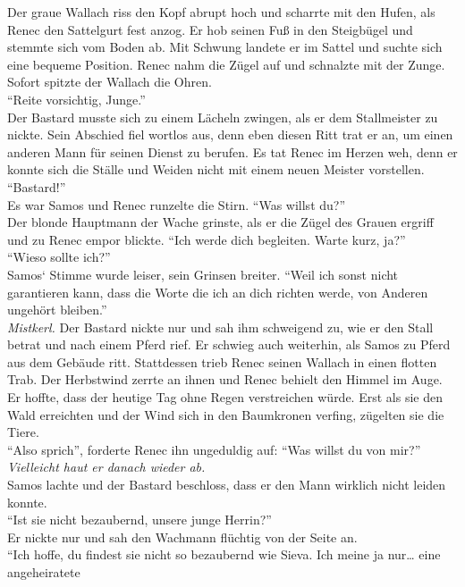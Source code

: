 Der graue Wallach riss den Kopf abrupt hoch und scharrte mit den Hufen, als Renec den Sattelgurt 
fest anzog. Er hob seinen Fuß in den Steigbügel und stemmte sich vom Boden ab. Mit Schwung landete 
er im Sattel und suchte sich eine bequeme Position. Renec nahm die Zügel auf und schnalzte mit der 
Zunge. Sofort spitzte der Wallach die Ohren.\\
``Reite vorsichtig, Junge.''\\
Der Bastard musste sich zu einem Lächeln zwingen, als er dem Stallmeister zu nickte. Sein 
Abschied fiel wortlos aus, denn eben diesen Ritt trat er an, um einen anderen Mann für seinen 
Dienst zu berufen. Es tat Renec im Herzen weh, denn er konnte sich die Ställe und Weiden nicht mit 
einem neuen Meister vorstellen.\\
``Bastard!''\\
Es war Samos und Renec runzelte die Stirn. ``Was willst du?''\\
Der blonde Hauptmann der Wache grinste, als er die Zügel des Grauen ergriff und zu Renec empor 
blickte. ``Ich werde dich begleiten. Warte kurz, ja?''\\
``Wieso sollte ich?''\\
Samos‘ Stimme wurde leiser, sein Grinsen breiter. ``Weil ich sonst nicht garantieren kann, dass die 
Worte die ich an dich richten werde, von Anderen ungehört bleiben.''\\
\textit{Mistkerl.}
Der Bastard nickte nur und sah ihm schweigend zu, wie er den Stall betrat und nach einem Pferd 
rief. Er schwieg auch weiterhin, als Samos zu Pferd aus dem Gebäude ritt. Stattdessen trieb 
Renec seinen Wallach in einen flotten Trab. Der Herbstwind zerrte an ihnen und Renec 
behielt den Himmel im Auge. Er hoffte, dass der heutige Tag ohne Regen verstreichen würde. Erst als 
sie den Wald erreichten und der Wind sich in den Baumkronen verfing, zügelten sie die Tiere.\\
``Also sprich'', forderte Renec ihn ungeduldig auf: ``Was willst du von mir?''\\
\textit{Vielleicht haut er danach wieder ab.}\\
Samos lachte und der Bastard beschloss, dass er den Mann wirklich nicht leiden konnte.\\
``Ist sie nicht bezaubernd, unsere junge Herrin?''\\
Er nickte nur und sah den Wachmann flüchtig von der Seite an.\\
``Ich hoffe, du findest sie nicht so bezaubernd wie Sieva. Ich meine ja nur… eine angeheiratete 
